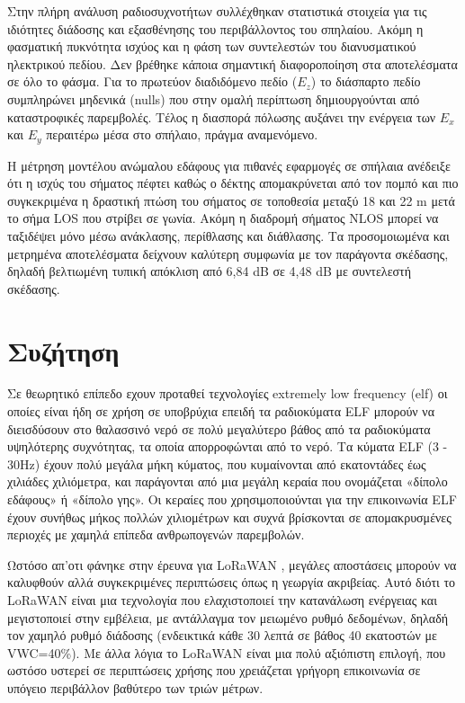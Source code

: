 \documentclass[12pt]{article}
\begin{document}
\begin{multicols*}{2}
        Στην πλήρη ανάλυση ραδιοσυχνοτήτων \cite{pingenot_full_2005} συλλέχθηκαν στατιστικά στοιχεία
        για τις ιδιότητες διάδοσης και εξασθένησης του περιβάλλοντος του σπηλαίου. Ακόμη η φασματική
        πυκνότητα ισχύος και η φάση των συντελεστών του διανυσματικού ηλεκτρικού πεδίου. Δεν βρέθηκε
        κάποια σημαντική διαφοροποίηση στα αποτελέσματα σε όλο το φάσμα. Για το πρωτεύον διαδιδόμενο
        πεδίο ($E_z$) το διάσπαρτο πεδίο συμπληρώνει μηδενικά (nulls) που στην ομαλή περίπτωση 
        δημιουργούνται από καταστροφικές παρεμβολές. Τέλος η διασπορά πόλωσης αυξάνει την ενέργεια
        των $E_x$ και $E_y$ περαιτέρω μέσα στο σπήλαιο, πράγμα αναμενόμενο.

        Η μέτρηση μοντέλου ανώμαλου εδάφους για πιθανές εφαρμογές σε σπήλαια \cite{soo_measurement_2019}
        ανέδειξε ότι η ισχύς του σήματος πέφτει καθώς ο δέκτης απομακρύνεται από τον πομπό και πιο
        συγκεκριμένα η δραστική πτώση του σήματος σε τοποθεσία μεταξύ 18 και 22 m μετά το σήμα LOS
        που στρίβει σε γωνία. Ακόμη η διαδρομή σήματος NLOS μπορεί να ταξιδέψει μόνο μέσω ανάκλασης,
        περίθλασης και διάθλασης. Τα προσομοιωμένα και μετρημένα αποτελέσματα δείχνουν καλύτερη συμφωνία
        με τον παράγοντα σκέδασης, δηλαδή βελτιωμένη τυπική απόκλιση από 6,84 dB σε 4,48 dB με συντελεστή
        σκέδασης.

    \section{\textsf{Συζήτηση}}
        Σε θεωρητικό επίπεδο εχουν προταθεί τεχνολογίες extremely low frequency
        (elf) οι οποίες είναι ήδη σε χρήση σε υποβρύχια επειδή τα ραδιοκύματα ELF μπορούν να
        διεισδύσουν στο θαλασσινό νερό σε πολύ μεγαλύτερο βάθος από τα ραδιοκύματα υψηλότερης
        συχνότητας, τα οποία απορροφώνται από το νερό. Τα κύματα ELF (3 - 30Hz) έχουν πολύ
        μεγάλα μήκη κύματος, που κυμαίνονται από εκατοντάδες έως χιλιάδες χιλιόμετρα, και
        παράγονται από μια μεγάλη κεραία που ονομάζεται «δίπολο εδάφους» ή «δίπολο γης». Οι
        κεραίες που χρησιμοποιούνται για την επικοινωνία ELF έχουν συνήθως μήκος πολλών
        χιλιομέτρων και συχνά βρίσκονται σε απομακρυσμένες περιοχές με χαμηλά επίπεδα
        ανθρωπογενών παρεμβολών.

        Ωστόσο απ'οτι φάνηκε στην έρευνα για LoRaWAN \cite{zhao_feasibility_2023}, μεγάλες 
        αποστάσεις μπορούν να καλυφθούν αλλά συγκεκριμένες περιπτώσεις όπως η γεωργία ακριβείας.
        Αυτό διότι το LoRaWAN είναι μια τεχνολογία που ελαχιστοποιεί την κατανάλωση ενέργειας και
        μεγιστοποιεί στην εμβέλεια, με αντάλλαγμα τον μειωμένο ρυθμό δεδομένων, δηλαδή τον χαμηλό
        ρυθμό διάδοσης (ενδεικτικά κάθε 30 λεπτά σε βάθος 40 εκατοστών με VWC=40\%). Με άλλα
        λόγια το LoRaWAN είναι μια πολύ αξιόπιστη επιλογή, που ωστόσο υστερεί σε περιπτώσεις 
        χρήσης που χρειάζεται γρήγορη επικοινωνία σε υπόγειο περιβάλλον βαθύτερο των τριών μέτρων.


\end{multicols*}
\end{document}

